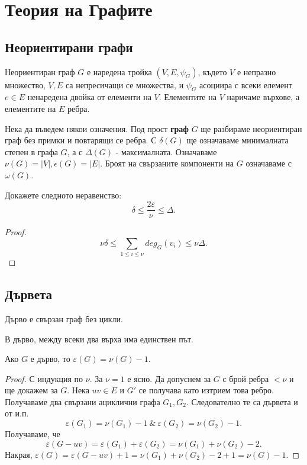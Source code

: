 \chapter{Теория на Графите}

\section{Неориентирани графи}

\begin{dfn}
  Неориентиран граф $G$ е наредена тройка $(V,E,\psi_G)$, където
  $V$ е непразно множество, $V,E$ са непресичащи се множества, и $\psi_G$ асоциира с всеки елемент $e\in E$
  ненаредена двойка от елементи на $V$.
  Елементите на $V$ наричаме върхове, а елементите на $E$ ребра.
\end{dfn}

Нека да въведем някои означения.
Под прост {\bf граф} $G$ ще разбираме неориентиран граф без примки и повтарящи се ребра.
С $\delta(G)$ ще означаваме минималната степен в графа $G$, а с $\Delta(G)$ - максималната.
Означаваме $\nu(G) = |V|, \epsilon(G) = |E|$.
Броят на свързаните компоненти на $G$ означаваме с $\omega(G)$.

\begin{problem}
  Докажете следното неравенство:
  \[\delta \leq \frac{2\varepsilon}{\nu} \leq \Delta.\]
\end{problem}
\begin{proof}
  \[\nu\delta \leq\sum_{1\leq i \leq\nu} deg_G(v_i) \leq \nu\Delta.\]
\end{proof}


\section{Дървета}

\begin{dfn}
  Дърво е свързан граф без цикли.
\end{dfn}

\begin{thm}
  В дърво, между всеки два върха има единствен път.
\end{thm}

\begin{thm}
  Ако $G$ е дърво, то $\varepsilon(G) = \nu(G) - 1$.
\end{thm}
\begin{proof}
  С индукция по $\nu$. За $\nu = 1$ е ясно.
  Да допуснем за $G$ с брой ребра $<\nu$ и ще докажем за $G$.
  Нека $uv\in E$ и $G'$ се получава като изтрием това ребро.
  Получаваме два свързани ациклични графа $G_1, G_2$.
  Следователно те са дървета и от и.п. 
  \[\varepsilon(G_1) = \nu(G_1) - 1\ \&\ \varepsilon(G_2) = \nu(G_2) - 1.\]
  Получаваме, че 
  \[\varepsilon(G - uv) = \varepsilon(G_1) + \varepsilon(G_2) = \nu(G_1) + \nu(G_2) - 2.\]
  Накрая, $\varepsilon(G) = \varepsilon(G-uv) + 1 = \nu(G_1) + \nu(G_2) - 2 + 1= \nu(G) - 1$.
\end{proof}

